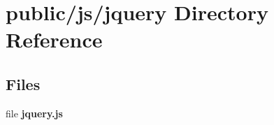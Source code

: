 \section{public/js/jquery Directory Reference}
\label{dir_4687b62d8427415fa4b3cad182e3dcf3}
\subsection*{Files}
\begin{DoxyCompactItemize}
\item 
file {\bf jquery.\+js}
\end{DoxyCompactItemize}

